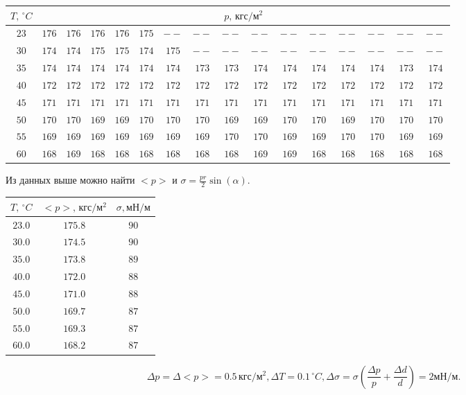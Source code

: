 \begin{center}
\begin{tabular}{|c|c|c|c|c|c|c|c|c|c|c|c|c|c|c|c|}
\hline
$T,\,^\circ C$&\multicolumn{15}{c|}{$p,\,\text{кгс}/\text{м}^2$}\\
\hline
$23$&$176$&$176$&$176$&$176$&$175$&$--$&$--$&$--$&$--$&$--$&$--$&$--$&$--$&$--$&$--$\\
\hline
$30$&$174$&$174$&$175$&$175$&$174$&$175$&$--$&$--$&$--$&$--$&$--$&$--$&$--$&$--$&$--$\\
\hline
$35$&$174$&$174$&$174$&$174$&$174$&$174$&$173$&$173$&$174$&$174$&$174$&$174$&$174$&$173$&$174$\\
\hline
$40$&$172$&$172$&$172$&$172$&$172$&$172$&$172$&$172$&$172$&$172$&$172$&$172$&$172$&$172$&$172$\\
\hline
$45$&$171$&$171$&$171$&$171$&$171$&$171$&$171$&$171$&$171$&$171$&$171$&$171$&$171$&$171$&$171$\\
\hline
$50$&$170$&$170$&$169$&$169$&$170$&$170$&$170$&$169$&$169$&$170$&$170$&$169$&$170$&$170$&$170$\\
\hline
$55$&$169$&$169$&$169$&$169$&$169$&$169$&$169$&$170$&$170$&$169$&$169$&$170$&$170$&$169$&$169$\\
\hline
$60$&$168$&$169$&$168$&$168$&$168$&$168$&$168$&$168$&$169$&$169$&$168$&$168$&$168$&$168$&$168$\\
\hline
\end{tabular}
\end{center}
Из данных выше можно найти $<p>$ и $\sigma = \frac{pr}{2} \sin(\alpha)$.
\begin{center}
\begin{tabular}{|c|c|c|}
\hline
$T,\,^\circ C$&$<p>,\,\text{кгс}/\text{м}^2$&$\sigma, \text{мН}/\text{м}$\\\hline
$23.0$&$175.8$&$90$\\ \hline
$30.0$&$174.5$&$90$\\ \hline
$35.0$&$173.8$&$89$\\ \hline
$40.0$&$172.0$&$88$\\ \hline
$45.0$&$171.0$&$88$\\ \hline
$50.0$&$169.7$&$87$\\ \hline
$55.0$&$169.3$&$87$\\ \hline
$60.0$&$168.2$&$87$\\ \hline
\end{tabular}
\end{center}
$$\Delta p = \Delta <p> = 0.5\,\text{кгс}/\text{м}^2, \Delta T = 0.1\,^\circ C, \Delta \sigma = \sigma (\frac{\Delta p}{p} + \frac{\Delta d}{d}) = 2 \text{мН}/\text{м}.$$
